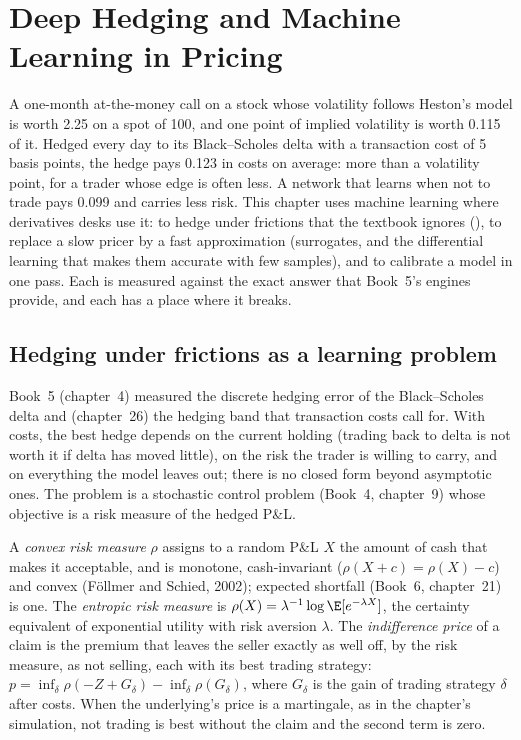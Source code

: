 \chapter{Deep Hedging and Machine Learning in Pricing}\label{ch:ml:deep-hedging-and-machine-learning-in-pricing}

A one-month at-the-money call on a stock whose volatility follows Heston's model is worth 2.25 on a spot of 100, and one point
of implied volatility is worth 0.115 of it. Hedged every day to its Black--Scholes delta with a transaction cost of 5 basis
points, the hedge pays 0.123 in costs on average: more than a volatility point, for a trader whose edge is often less. A
network that learns when not to trade pays 0.099 and carries less risk. This chapter uses machine learning where
derivatives desks use it: to hedge under frictions that the textbook ignores (), to replace a slow pricer by a
fast approximation (surrogates, and the differential learning that makes them accurate with few samples), and to calibrate
a model in one pass. Each is measured against the exact answer that Book~5's engines provide, and each has a place where it
breaks.

\section{Hedging under frictions as a learning problem}

Book~5 (chapter~4) measured the discrete hedging error of the Black--Scholes delta and (chapter~26) the hedging band that
transaction costs call for. With costs, the best hedge depends on the current holding (trading back to delta is not worth it
if delta has moved little), on the risk the trader is willing to carry, and on everything the model leaves out; there is no
closed form beyond asymptotic ones. The problem is a stochastic control problem (Book~4, chapter~9) whose objective is a risk
measure of the hedged P\&L.

\begin{definition}\label{def:ml:deep-hedging-and-machine-learning-in-pricing:risk}
A \emph{convex risk measure} $\rho$ assigns to a random P\&L $X$ the amount of cash that makes it
acceptable, and is monotone, cash-invariant ($\rho(X + c) = \rho(X) - c$) and convex (Föllmer and Schied, 2002); expected
shortfall (Book~6, chapter~21) is one. The \emph{entropic risk measure} is $\rho(X) =
\lambda^{-1}\log\E[e^{-\lambda X}]$, the certainty equivalent of exponential utility with risk aversion $\lambda$. The
\emph{indifference price} of a claim is the premium that leaves the seller exactly as well off, by
the risk measure, as not selling, each with its best trading strategy: $p = \inf_\delta\rho(-Z + G_\delta) -
\inf_\delta\rho(G_\delta)$, where $G_\delta$ is the gain of trading strategy $\delta$ after costs. When the underlying's
price is a martingale, as in the chapter's simulation, not trading is best without the claim and the second term is zero.
\end{definition}

